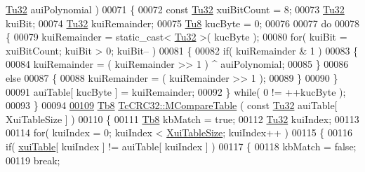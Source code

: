 \begin{DoxyCode}
      \mbox{\hyperlink{namespace_g_n_common_a941b527ef318f318aed7903dc832b7e4}{Tu32}} auiPolynomial )
00071 \{
00072    \textcolor{keyword}{const} \mbox{\hyperlink{namespace_g_n_common_a941b527ef318f318aed7903dc832b7e4}{Tu32}} xuiBitCount = 8;
00073    \mbox{\hyperlink{namespace_g_n_common_a941b527ef318f318aed7903dc832b7e4}{Tu32}} kuiBit;
00074    \mbox{\hyperlink{namespace_g_n_common_a941b527ef318f318aed7903dc832b7e4}{Tu32}} kuiRemainder;
00075    \mbox{\hyperlink{namespace_g_n_common_a7939e251ddbf5d3a31832dcfdc8bde39}{Tu8}}  kucByte = 0;
00076 
00077    \textcolor{keywordflow}{do}
00078    \{
00079       kuiRemainder = \textcolor{keyword}{static\_cast<} \mbox{\hyperlink{namespace_g_n_common_a941b527ef318f318aed7903dc832b7e4}{Tu32}} \textcolor{keyword}{>}( kucByte );
00080       \textcolor{keywordflow}{for}( kuiBit = xuiBitCount; kuiBit > 0; kuiBit-- )
00081       \{
00082          \textcolor{keywordflow}{if}( kuiRemainder & 1 )
00083          \{
00084             kuiRemainder = ( kuiRemainder >> 1 ) ^ auiPolynomial;
00085          \}
00086          \textcolor{keywordflow}{else}
00087          \{
00088             kuiRemainder = ( kuiRemainder >> 1 );
00089          \}
00090       \}
00091       auiTable[ kucByte ] = kuiRemainder;
00092    \} \textcolor{keywordflow}{while}( 0 != ++kucByte );
00093 \}
00094 
\mbox{\hyperlink{class_g_n_common_1_1_n_data_authentication_1_1_tc_c_r_c32_a2f822ac900cdba0a94b8e9361eb86b5c}{00109}} \mbox{\hyperlink{namespace_g_n_common_a8115dc7ed53b6e5b52e6bfde1632ea74}{Tb8}} \mbox{\hyperlink{class_g_n_common_1_1_n_data_authentication_1_1_tc_c_r_c32_a2f822ac900cdba0a94b8e9361eb86b5c}{TcCRC32::MCompareTable}} ( \textcolor{keyword}{const} \mbox{\hyperlink{namespace_g_n_common_a941b527ef318f318aed7903dc832b7e4}{Tu32}} auiTable[ XuiTableSize ] )
00110 \{
00111    \mbox{\hyperlink{namespace_g_n_common_a8115dc7ed53b6e5b52e6bfde1632ea74}{Tb8}}  kbMatch = \textcolor{keyword}{true};
00112    \mbox{\hyperlink{namespace_g_n_common_a941b527ef318f318aed7903dc832b7e4}{Tu32}} kuiIndex;
00113 
00114    \textcolor{keywordflow}{for}( kuiIndex = 0; kuiIndex < \mbox{\hyperlink{class_g_n_common_1_1_n_data_authentication_1_1_tc_c_r_c32_a520aaabe0f4ade7f38afd480281b2180}{XuiTableSize}}; kuiIndex++ )
00115    \{
00116       \textcolor{keywordflow}{if}( \mbox{\hyperlink{class_g_n_common_1_1_n_data_authentication_1_1_tc_c_r_c32_a4aafd40037856d1bd4ea6f6ce0928836}{xuiTable}}[ kuiIndex ] != auiTable[ kuiIndex ] )
00117       \{
00118          kbMatch = \textcolor{keyword}{false};
00119          \textcolor{keywordflow}{break};

\end{DoxyCode}

